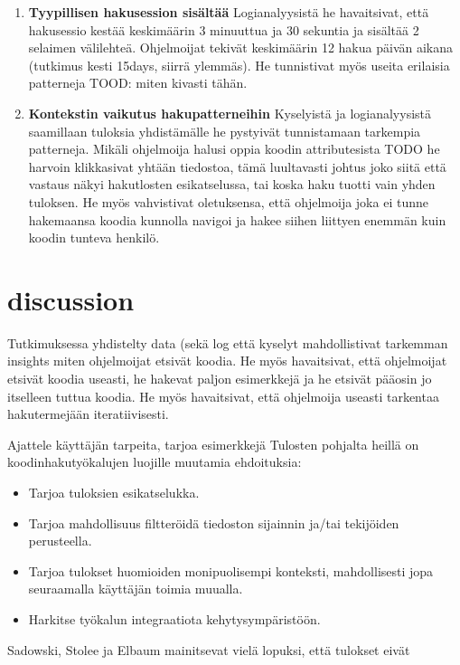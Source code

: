 \documentclass[finnish]{../tktltiki2}
\theoremstyle{definition}
\theoremstyle{remark}
\begin{document}
\begin{enumerate}
  \item {\bf Tyypillisen hakusession sisältää}
    Logianalyysistä he havaitsivat, että hakusessio kestää keskimäärin 3 minuuttua ja 30 sekuntia ja sisältää 2 selaimen välilehteä. Ohjelmoijat tekivät keskimäärin 12 hakua päivän aikana (tutkimus kesti 15days, siirrä ylemmäs). He tunnistivat myös useita erilaisia patterneja TOOD: miten kivasti tähän.

  \item {\bf Kontekstin vaikutus hakupatterneihin}
    Kyselyistä ja logianalyysistä saamillaan tuloksia yhdistämälle he pystyivät tunnistamaan tarkempia patterneja. Mikäli ohjelmoija halusi oppia koodin attributesista TODO he harvoin klikkasivat yhtään tiedostoa, tämä luultavasti johtus joko siitä että vastaus näkyi hakutlosten esikatselussa, tai koska haku tuotti vain yhden tuloksen. He myös vahvistivat oletuksensa, että ohjelmoija joka ei tunne hakemaansa koodia kunnolla navigoi ja hakee siihen liittyen enemmän kuin koodin tunteva henkilö.

\end{enumerate}

\section{discussion}
Tutkimuksessa yhdistelty data (sekä log että kyselyt mahdollistivat tarkemman insights miten ohjelmoijat etsivät koodia. He myös havaitsivat, että ohjelmoijat etsivät koodia useasti, he hakevat paljon esimerkkejä ja he etsivät pääosin jo itselleen tuttua koodia. He myös havaitsivat, että ohjelmoija useasti tarkentaa hakutermejään iteratiivisesti.

Ajattele käyttäjän tarpeita, tarjoa esimerkkejä
Tulosten pohjalta heillä on koodinhakutyökalujen luojille muutamia ehdoituksia:
\begin{itemize}
    \item Tarjoa tuloksien esikatselukka.
    \item Tarjoa mahdollisuus filtteröidä tiedoston sijainnin ja/tai tekijöiden perusteella.
    \item Tarjoa tulokset huomioiden monipuolisempi konteksti, mahdollisesti jopa seuraamalla käyttäjän toimia muualla.
    \item Harkitse työkalun integraatiota kehytysympäristöön.
\end{itemize}


Sadowski, Stolee ja Elbaum mainitsevat vielä lopuksi, että tulokset eivät
\end{document}
